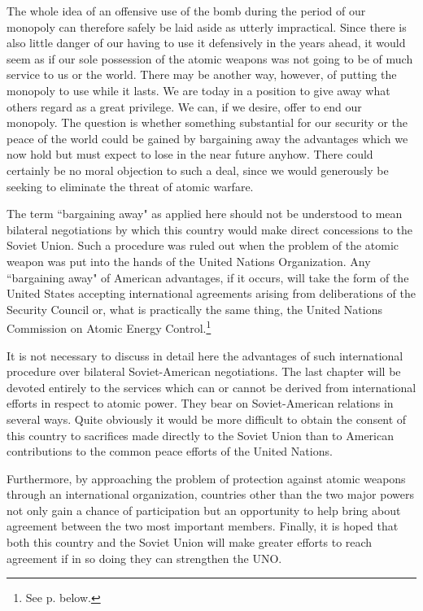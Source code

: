The whole idea of an offensive use of the bomb during the period of our monopoly can therefore safely be laid aside as utterly impractical. Since there is also little danger of our having to use it defensively in the years ahead, it would seem as if our sole possession of the atomic weapons was not going to be of much service to us or the world. There may be another way, however, of putting the monopoly to use while it lasts. We are today in a position to give away what others regard as a great privilege. We can, if we desire, offer to end our monopoly. The question is whether something substantial for our security or the peace of the world could be gained by bargaining away the advantages which we now hold but must expect to lose in the near future anyhow. There could certainly be no moral objection to such a deal, since we would generously be seeking to eliminate the threat of atomic warfare.

The term ``bargaining away" as applied here should not be understood to mean bilateral negotiations by which this country would make direct concessions to the Soviet Union. Such a procedure was ruled out when the problem of the atomic weapon was put into the hands of the United Nations Organization. Any ``bargaining away" of American advantages, if it occurs, will take the form of the United States accepting international agreements arising from deliberations of the Security Council or, what is practically the same thing, the United Nations Commission on Atomic Energy Control.\footnote{See p. \pageref{V-UNSC} below.}

It is not necessary to discuss in detail here the advantages of such international procedure over bilateral Soviet-American negotiations. The last chapter will be devoted entirely to the services which can or cannot be derived from international efforts in respect to atomic power. They bear on Soviet-American relations in several ways. Quite obviously it would be more difficult to obtain the consent of this country to sacrifices made directly to the Soviet Union than to American contributions to the common peace efforts of the United Nations.

Furthermore, by approaching the problem of protection against atomic weapons through an international organization, countries other than the two major powers not only gain a chance of participation but an opportunity to help bring about agreement between the two most important members. Finally, it is hoped that both this country and the Soviet Union will make greater efforts to reach agreement if in so doing they can strengthen the UNO.

